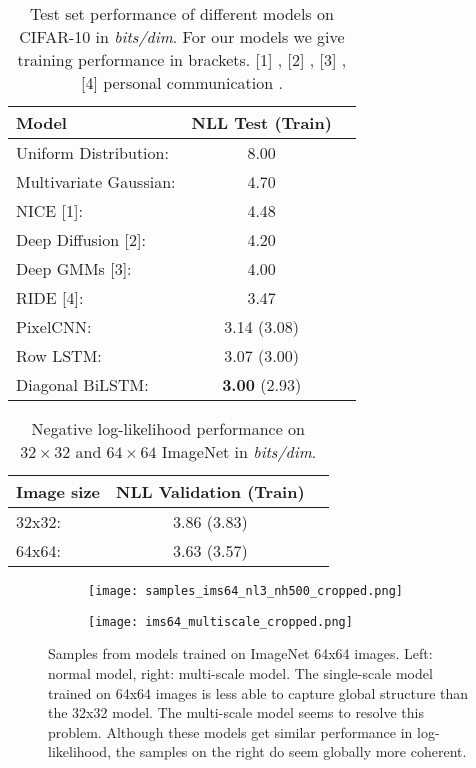 \documentclass{article}
\begin{document}
\begin{table}[!h]
\centering
	\begin{tabular}{lcc}
		\toprule
		\textbf{Model} & \textbf{NLL Test (Train)}  \\ 
		\midrule
		Uniform Distribution: & 8.00 \\ 
		Multivariate Gaussian: & 4.70 \\ 
		NICE [1]: & 4.48 \\ 
		Deep Diffusion [2]: & 4.20 \\ 
		Deep GMMs [3]: & 4.00 \\
		RIDE [4]: & 3.47 \\ 
		\midrule
		PixelCNN: & 3.14 (3.08) \\ 
		Row LSTM: & 3.07 (3.00) \\ 
		Diagonal BiLSTM: \quad\quad\quad\quad\quad\quad\quad & \textbf{3.00} (2.93) \\ 
	    \bottomrule
	\end{tabular}
\caption{Test set performance of different models on CIFAR-10 in \emph{bits/dim}. For our models we give training performance in brackets. [1] \cite{dinh2014nice}, [2] \cite{deepdiffusion}, [3] \cite{van2014factoring}, [4] personal communication \cite{theis2015generative}.}
\label{table:cifar10}
\end{table}

\begin{table}[!h]
	\begin{center}
	\begin{tabular}{lcc}
		\toprule
		\textbf{Image size} & \textbf{NLL Validation (Train)}  \\ 
		\midrule
		32x32: & 3.86 (3.83) \\ 
		64x64: & 3.63 (3.57) \\ 
	    \bottomrule
	\end{tabular}
	\end{center}
\vspace{-0.2cm}
\caption{Negative log-likelihood performance on $32\times32$ and $64\times64$ ImageNet in \emph{bits/dim}.}
\label{table:imagenet}
\vspace{-0.4cm}
\end{table}


\begin{figure*}[ht]

\begin{subfigure}{.5\textwidth}
  \centering
\texttt{[image: samples\_ims64\_nl3\_nh500\_cropped.png]}
\end{subfigure}\hfill
\begin{subfigure}{.5\textwidth}
  \centering
\texttt{[image: ims64\_multiscale\_cropped.png]}
\end{subfigure}\hfill
\caption{Samples from models trained on ImageNet 64x64 images. Left: normal model, right: multi-scale model. The single-scale model trained on 64x64 images is less able to capture global structure than the 32x32 model. The multi-scale model seems to resolve this problem. Although these models get similar performance in log-likelihood, the samples on the right do seem globally more coherent.}
\label{fig:samples_64}
\end{figure*}
\end{document}
